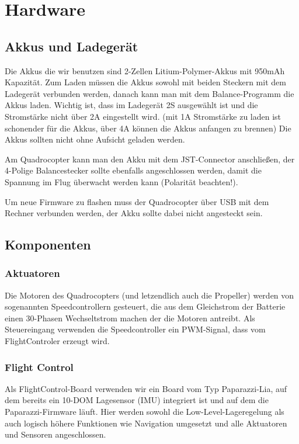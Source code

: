 \section{Hardware}

\subsection{Akkus und Ladegerät}
Die Akkus die wir benutzen sind 2-Zellen Litium-Polymer-Akkus mit 950mAh Kapazität.
Zum Laden müssen die Akkus sowohl mit beiden Steckern mit dem Ladegerät verbunden werden, danach kann man mit dem Balance-Programm die Akkus laden.
Wichtig ist, dass im Ladegerät 2S ausgewählt ist und die Stromstärke nicht über 2A eingestellt wird.
(mit 1A Stromstärke zu laden ist schonender für die Akkus, über 4A können die Akkus anfangen zu brennen)
Die Akkus sollten nicht ohne Aufsicht geladen werden.

Am Quadrocopter kann man den Akku mit dem JST-Connector anschließen, der 4-Polige Balancestecker sollte ebenfalls angeschlossen werden, damit die Spannung im Flug überwacht werden kann (Polarität beachten!).

Um neue Firmware zu flashen muss der Quadrocopter über USB mit dem Rechner verbunden werden, der Akku sollte dabei nicht angesteckt sein.

\subsection{Komponenten}
\subsubsection{Aktuatoren}

Die Motoren des Quadrocopters (und letzendlich auch die Propeller) werden von sogenannten Speedcontrollern gesteuert, die aus dem Gleichstrom der Batterie einen 30-Phasen Wechseltstrom machen der die Motoren antreibt.
Als Steuereingang verwenden die Speedcontroller ein PWM-Signal, dass vom FlightControler erzeugt wird.


\subsubsection{Flight Control}

Als FlightControl-Board verwenden wir ein Board vom Typ Paparazzi-Lia, auf dem bereits ein 10-DOM Lagesensor (IMU) integriert ist und auf dem die Paparazzi-Firmware läuft. Hier werden sowohl die Low-Level-Lageregelung als auch logisch höhere Funktionen wie Navigation umgesetzt und alle Aktuatoren und Sensoren angeschlossen.

